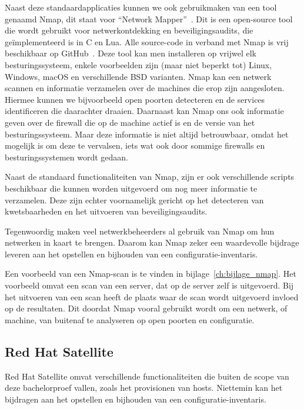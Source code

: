 Naast deze standaardapplicaties kunnen we ook gebruikmaken van een tool genaamd Nmap, dit staat voor ``Network Mapper''~\autocite{nmap-website}.
Dit is een open-source tool die wordt gebruikt voor netwerkontdekking en beveiligingsaudits, die ge\"implementeerd is in C en Lua.
Alle source-code in verband met Nmap is vrij beschikbaar op GitHub~\autocite{nmap-github}.
Deze tool kan men installeren op vrijwel elk besturingssysteem, enkele voorbeelden zijn (maar niet beperkt tot) Linux, Windows, macOS en verschillende BSD varianten.
Nmap kan een netwerk scannen en informatie verzamelen over de machines die erop zijn aangesloten.
Hiermee kunnen we bijvoorbeeld open poorten detecteren en de services identificeren die daarachter draaien.
Daarnaast kan Nmap ons ook informatie geven over de firewall die op de machine actief is en de versie van het besturingssysteem.
Maar deze informatie is niet altijd betrouwbaar, omdat het mogelijk is om deze te vervalsen, iets wat ook door sommige firewalls en besturingssystemen wordt gedaan.

Naast de standaard functionaliteiten van Nmap, zijn er ook verschillende scripts beschikbaar die kunnen worden uitgevoerd om nog meer informatie te verzamelen.
Deze zijn echter voornamelijk gericht op het detecteren van kwetsbaarheden en het uitvoeren van beveiligingsaudits.

Tegenwoordig maken veel netwerkbeheerders al gebruik van Nmap om hun netwerken in kaart te brengen.
Daarom kan Nmap zeker een waardevolle bijdrage leveren aan het opstellen en bijhouden van een configuratie-inventaris.

Een voorbeeld van een Nmap-scan is te vinden in bijlage~\ref{ch:bijlage_nmap}.
Het voorbeeld omvat een scan van een server, dat op de server zelf is uitgevoerd.
Bij het uitvoeren van een scan heeft de plaats waar de scan wordt uitgevoerd invloed op de resultaten.
Dit doordat Nmap vooral gebruikt wordt om een netwerk, of machine, van buitenaf te analyseren op open poorten en configuratie.

\subsection{Red Hat Satellite}
\label{sub:red-hat-satellite}

Red Hat Satellite omvat verschillende functionaliteiten die buiten de scope van deze bachelorproef vallen, zoals het provisionen van hosts.
Niettemin kan het bijdragen aan het opstellen en bijhouden van een configuratie-inventaris.

